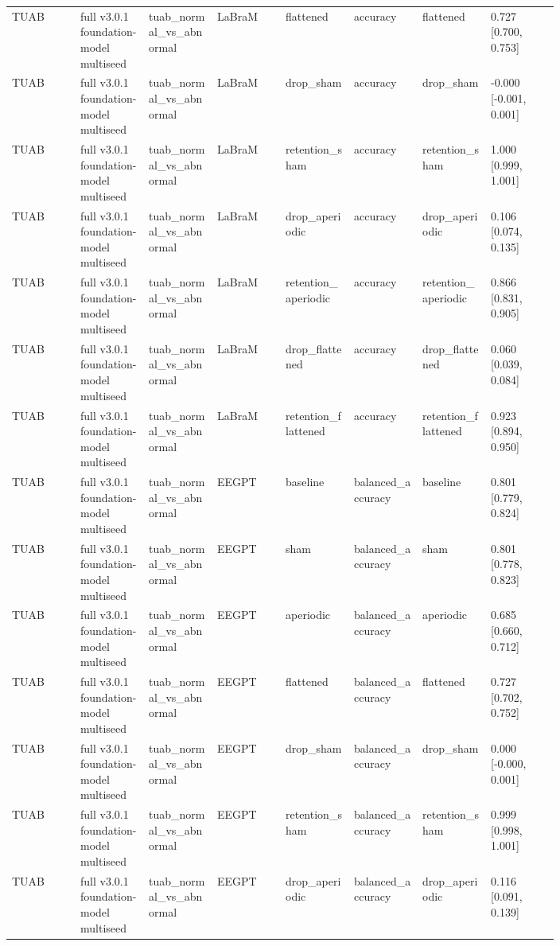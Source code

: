 \begin{longtable}{p{0.10\linewidth}p{0.10\linewidth}p{0.10\linewidth}p{0.10\linewidth}p{0.10\linewidth}p{0.10\linewidth}p{0.10\linewidth}p{0.10\linewidth}}
TUAB & full v3.0.1 foundation-model multiseed & tuab\_normal\_vs\_abnormal & LaBraM & flattened & accuracy & flattened & 0.727 [0.700, 0.753]\\
TUAB & full v3.0.1 foundation-model multiseed & tuab\_normal\_vs\_abnormal & LaBraM & drop\_sham & accuracy & drop\_sham & -0.000 [-0.001, 0.001]\\
TUAB & full v3.0.1 foundation-model multiseed & tuab\_normal\_vs\_abnormal & LaBraM & retention\_sham & accuracy & retention\_sham & 1.000 [0.999, 1.001]\\
TUAB & full v3.0.1 foundation-model multiseed & tuab\_normal\_vs\_abnormal & LaBraM & drop\_aperiodic & accuracy & drop\_aperiodic & 0.106 [0.074, 0.135]\\
TUAB & full v3.0.1 foundation-model multiseed & tuab\_normal\_vs\_abnormal & LaBraM & retention\_aperiodic & accuracy & retention\_aperiodic & 0.866 [0.831, 0.905]\\
TUAB & full v3.0.1 foundation-model multiseed & tuab\_normal\_vs\_abnormal & LaBraM & drop\_flattened & accuracy & drop\_flattened & 0.060 [0.039, 0.084]\\
TUAB & full v3.0.1 foundation-model multiseed & tuab\_normal\_vs\_abnormal & LaBraM & retention\_flattened & accuracy & retention\_flattened & 0.923 [0.894, 0.950]\\
TUAB & full v3.0.1 foundation-model multiseed & tuab\_normal\_vs\_abnormal & EEGPT & baseline & balanced\_accuracy & baseline & 0.801 [0.779, 0.824]\\
TUAB & full v3.0.1 foundation-model multiseed & tuab\_normal\_vs\_abnormal & EEGPT & sham & balanced\_accuracy & sham & 0.801 [0.778, 0.823]\\
TUAB & full v3.0.1 foundation-model multiseed & tuab\_normal\_vs\_abnormal & EEGPT & aperiodic & balanced\_accuracy & aperiodic & 0.685 [0.660, 0.712]\\
TUAB & full v3.0.1 foundation-model multiseed & tuab\_normal\_vs\_abnormal & EEGPT & flattened & balanced\_accuracy & flattened & 0.727 [0.702, 0.752]\\
TUAB & full v3.0.1 foundation-model multiseed & tuab\_normal\_vs\_abnormal & EEGPT & drop\_sham & balanced\_accuracy & drop\_sham & 0.000 [-0.000, 0.001]\\
TUAB & full v3.0.1 foundation-model multiseed & tuab\_normal\_vs\_abnormal & EEGPT & retention\_sham & balanced\_accuracy & retention\_sham & 0.999 [0.998, 1.001]\\
TUAB & full v3.0.1 foundation-model multiseed & tuab\_normal\_vs\_abnormal & EEGPT & drop\_aperiodic & balanced\_accuracy & drop\_aperiodic & 0.116 [0.091, 0.139]\\

\end{longtable}

